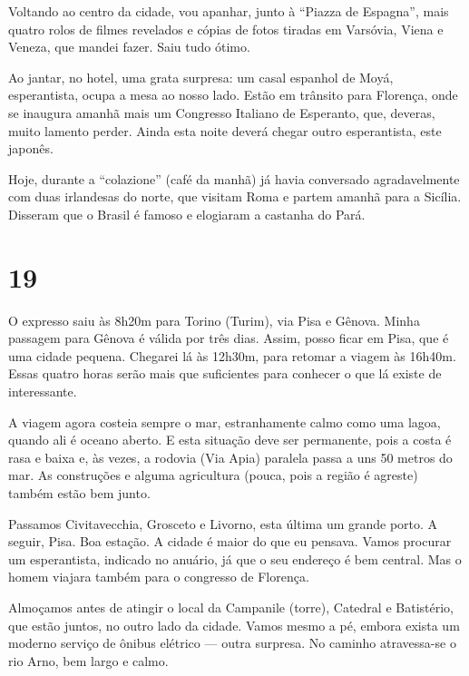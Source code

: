 Voltando ao centro da cidade, vou apanhar, junto à ``Piazza de Espagna'', mais quatro rolos de filmes revelados e cópias de fotos tiradas em Varsóvia, Viena e Veneza, que mandei fazer. Saiu tudo ótimo.

Ao jantar, no hotel, uma grata surpresa: um casal espanhol de Moyá, esperantista, ocupa a mesa ao nosso lado. Estão em trânsito para Florença, onde se inaugura amanhã mais um Congresso Italiano de Esperanto, que, deveras, muito lamento perder. Ainda esta noite deverá chegar outro esperantista, este japonês.

Hoje, durante a ``colazione'' (café da manhã) já havia conversado agradavelmente com duas irlandesas do norte, que visitam Roma e partem amanhã para a Sicília. Disseram que o Brasil é famoso e elogiaram a castanha do Pará.

\section*{19 \adfflatleafright {}}
O expresso saiu às 8h20m para Torino (Turim), via Pisa e Gênova. Minha passagem para Gênova é válida por três dias. Assim, posso ficar em Pisa, que é uma cidade pequena. Chegarei lá às 12h30m, para retomar a viagem às 16h40m. Essas quatro horas serão mais que suficientes para conhecer o que lá existe de interessante.

A viagem agora costeia sempre o mar, estranhamente calmo como uma lagoa, quando ali é oceano aberto. E esta situação deve ser permanente, pois a costa é rasa e baixa e, às vezes, a rodovia (Via Apia) paralela passa a uns 50 metros do mar. As construções e alguma agricultura (pouca, pois a região é agreste) também estão bem junto.

Passamos Civitavecchia, Grosceto e Livorno, esta última um grande porto. A seguir, Pisa. Boa estação. A cidade é maior do que eu pensava. Vamos procurar um esperantista, indicado no anuário, já que o seu endereço é bem central. Mas o homem viajara também para o congresso de Florença.

Almoçamos antes de atingir o local da Campanile (torre), Catedral e Batistério, que estão juntos, no outro lado da cidade. Vamos mesmo a pé, embora exista um moderno serviço de ônibus elétrico --- outra surpresa. No caminho atravessa-se o rio Arno, bem largo e calmo.

